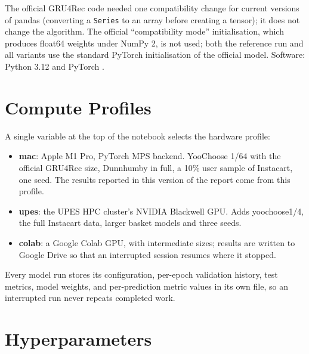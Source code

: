 \documentclass[12pt,a4paper]{report}
\begin{document}
The official GRU4Rec code needed one compatibility change for current versions of
pandas (converting a \texttt{Series} to an array before creating a tensor); it
does not change the algorithm. The official ``compatibility mode''
initialisation, which produces float64 weights under NumPy 2, is not used; both
the reference run and all variants use the standard PyTorch initialisation of
the official model. Software: Python 3.12 and PyTorch \cite{paszke2019}.

\section{Compute Profiles}

A single variable at the top of the notebook selects the hardware profile:

\begin{itemize}
    \item \textbf{mac}: Apple M1 Pro, PyTorch MPS backend. YooChoose 1/64 with
          the official GRU4Rec size, Dunnhumby in full, a 10\% user sample of
          Instacart, one seed. The results reported in this version of the report
          come from this profile.
    \item \textbf{upes}: the UPES HPC cluster's NVIDIA Blackwell GPU. Adds
          yoochoose1/4, the full Instacart data, larger basket models and three
          seeds.
    \item \textbf{colab}: a Google Colab GPU, with intermediate sizes; results are
          written to Google Drive so that an interrupted session resumes where it
          stopped.
\end{itemize}

Every model run stores its configuration, per-epoch validation history, test
metrics, model weights, and per-prediction metric values in its own file, so an
interrupted run never repeats completed work.

\section{Hyperparameters}
\end{document}
